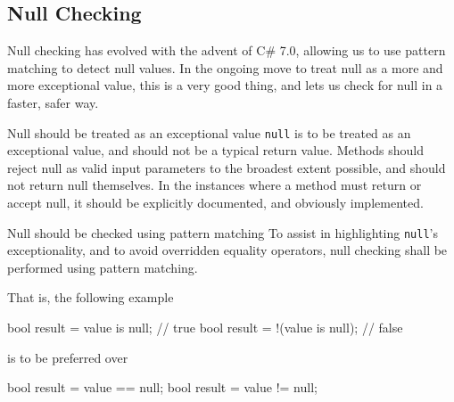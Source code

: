 \documentclass[11pt,a4paper]{article}
\begin{document}
\subsection{Null Checking}
Null checking has evolved with the advent of C\# 7.0, allowing us to use pattern matching to detect null values. In the ongoing move to treat null as a more and more exceptional value, this is a very good thing, and lets us check for null in a faster, safer way.

\begin{should}{Null should be treated as an exceptional value}
\texttt{null} is to be treated as an exceptional value, and should not be a typical return value. Methods should reject null as valid input parameters to the broadest extent possible, and should not return null themselves. In the instances where a method must return or accept null, it should be explicitly documented, and obviously implemented.
\end{should}

\begin{should}{Null should be checked using pattern matching}
To assist in highlighting \texttt{null}'s exceptionality, and to avoid overridden equality operators, null checking shall be performed using pattern matching.
\end{should}

That is, the following example
\begin{code}
bool result = value is null; // true
bool result = !(value is null); // false
\end{code}

is to be preferred over

\begin{code}
bool result = value == null;
bool result = value != null;
\end{code}

\printbibliography
\end{document}
